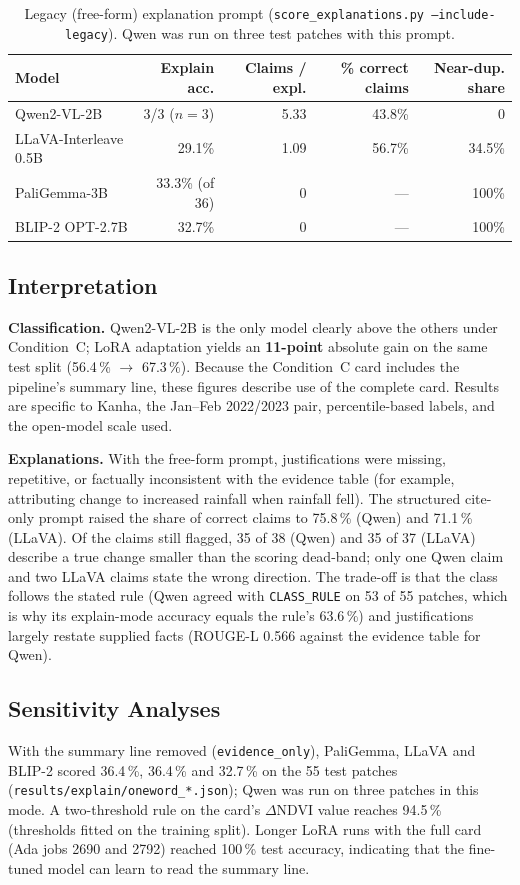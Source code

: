\documentclass[11pt]{article}
\begin{document}
\begin{table}[H]
\centering
\renewcommand{\arraystretch}{1.2}
\begin{tabular}{p{3.8cm} r r r r}
\toprule
\textbf{Model} & \textbf{Explain acc.} & \textbf{Claims / expl.} & \textbf{\% correct claims} & \textbf{Near-dup. share} \\
\midrule
Qwen2-VL-2B & 3/3 ($n=3$) & 5.33 & 43.8\% & 0 \\
LLaVA-Interleave 0.5B & 29.1\% & 1.09 & 56.7\% & 34.5\% \\
PaliGemma-3B & 33.3\% (of 36) & 0 & --- & 100\% \\
BLIP-2 OPT-2.7B & 32.7\% & 0 & --- & 100\% \\
\bottomrule
\end{tabular}
\caption{Legacy (free-form) explanation prompt (\texttt{score\_explanations.py --include-legacy}). Qwen was run on three test patches with this prompt.}
\label{tab:explain-scores}
\end{table}

\subsection{Interpretation}
\textbf{Classification.} Qwen2-VL-2B is the only model clearly above the others under Condition~C; LoRA adaptation yields an \textbf{11-point} absolute gain on the same test split (56.4\,\% $\rightarrow$ 67.3\,\%). Because the Condition~C card includes the pipeline's summary line, these figures describe use of the complete card. Results are specific to Kanha, the Jan--Feb 2022/2023 pair, percentile-based labels, and the open-model scale used.

\textbf{Explanations.} With the free-form prompt, justifications were missing, repetitive, or factually inconsistent with the evidence table (for example, attributing change to increased rainfall when rainfall fell). The structured cite-only prompt raised the share of correct claims to 75.8\,\% (Qwen) and 71.1\,\% (LLaVA). Of the claims still flagged, 35 of 38 (Qwen) and 35 of 37 (LLaVA) describe a true change smaller than the scoring dead-band; only one Qwen claim and two LLaVA claims state the wrong direction. The trade-off is that the class follows the stated rule (Qwen agreed with \texttt{CLASS\_RULE} on 53 of 55 patches, which is why its explain-mode accuracy equals the rule's 63.6\,\%) and justifications largely restate supplied facts (ROUGE-L 0.566 against the evidence table for Qwen).

\subsection{Sensitivity Analyses}
\label{sec:sensitivity}
With the summary line removed (\texttt{evidence\_only}), PaliGemma, LLaVA and BLIP-2 scored 36.4\,\%, 36.4\,\% and 32.7\,\% on the 55 test patches (\texttt{results/explain/oneword\_*.json}); Qwen was run on three patches in this mode. A two-threshold rule on the card's $\Delta$NDVI value reaches 94.5\,\% (thresholds fitted on the training split). Longer LoRA runs with the full card (Ada jobs 2690 and 2792) reached 100\,\% test accuracy, indicating that the fine-tuned model can learn to read the summary line.
\end{document}

